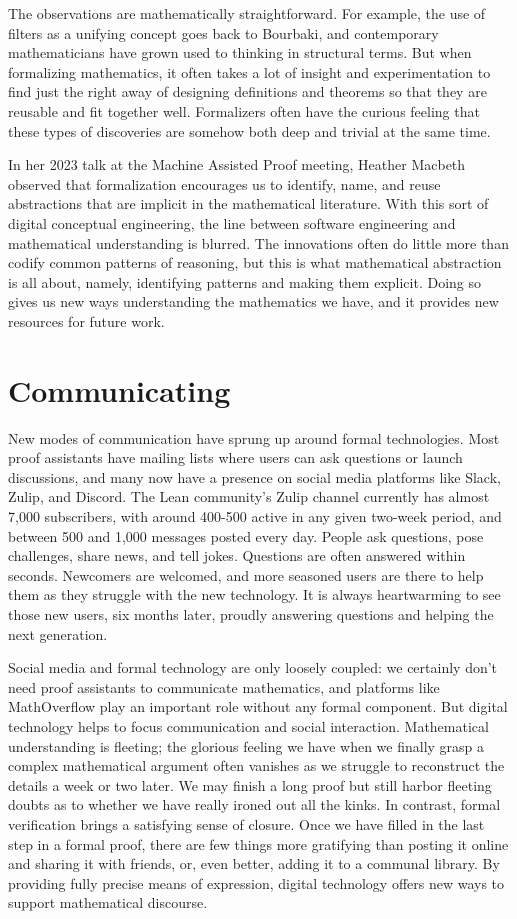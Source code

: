 \documentclass{amsart}
\theoremstyle{definition}
\theoremstyle{remark}
\numberwithin{equation}{section}
\begin{document}
The observations are mathematically straightforward. For example, the use of filters as a unifying concept goes back to Bourbaki, and contemporary mathematicians have grown used to thinking in structural terms. But when formalizing mathematics, it often takes a lot of insight and experimentation to find just the right away of designing definitions and theorems so that they are reusable and fit together well. Formalizers often have the curious feeling that these types of discoveries are somehow both deep and trivial at the same time.

In her 2023 talk at the Machine Assisted Proof meeting, Heather Macbeth observed that formalization encourages us to identify, name, and reuse abstractions that are implicit in the mathematical literature. With this sort of digital conceptual engineering, the line between software engineering and mathematical understanding is blurred. The innovations often do little more than codify common patterns of reasoning, but this is what mathematical abstraction is all about, namely, identifying patterns and making them explicit. Doing so gives us new ways understanding the mathematics we have, and it provides new resources for future work.


\section{Communicating}
\label{section:communication}

New modes of communication have sprung up around formal technologies. Most proof assistants have mailing lists where users can ask questions or launch discussions, and many now have a presence on social media platforms like Slack, Zulip, and Discord. The Lean community's Zulip channel currently has almost 7,000 subscribers, with around 400-500 active in any given two-week period, and between 500 and 1,000 messages posted every day. People ask questions, pose challenges, share news, and tell jokes. Questions are often answered within seconds. Newcomers are welcomed, and more seasoned users are there to help them as they struggle with the new technology. It is always heartwarming to see those new users, six months later, proudly answering questions and helping the next generation.

Social media and formal technology are only loosely coupled: we certainly don't need proof assistants to communicate mathematics, and platforms like MathOverflow play an important role without any formal component. But digital technology helps to focus communication and social interaction. Mathematical understanding is fleeting; the glorious feeling we have when we finally grasp a complex mathematical argument often vanishes as we struggle to reconstruct the details a week or two later. We may finish a long proof but still harbor fleeting doubts as to whether we have really ironed out all the kinks. In contrast, formal verification brings a satisfying sense of closure. Once we have filled in the last step in a formal proof, there are few things more gratifying than posting it online and sharing it with friends, or, even better, adding it to a communal library. By providing fully precise means of expression, digital technology offers new ways to support mathematical discourse.
\end{document}
